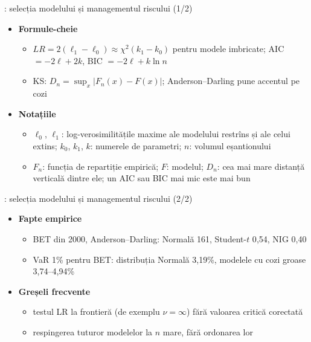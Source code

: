 \begin{frame}{: selecția modelului și managementul riscului (1/2)}
\itemsize{\small}
\begin{itemize}
    \item \textbf{Formule-cheie}
    \begin{itemize}
        \item $LR = 2(\ell_1 - \ell_0) \approx \chi^2(k_1 - k_0)$ pentru modele imbricate; AIC $= -2\ell + 2k$, BIC $= -2\ell + k\ln n$
        \item KS: $D_n = \sup_x|F_n(x) - F(x)|$; Anderson--Darling pune accentul pe cozi
    \end{itemize}
    \item \textbf{Notațiile}
    \begin{itemize}
        \item $\ell_0$, $\ell_1$: log-verosimilitățile maxime ale modelului restrîns și ale celui extins; $k_0$, $k_1$, $k$: numerele de parametri; $n$: volumul eșantionului
        \item $F_n$: funcția de repartiție empirică; $F$: modelul; $D_n$: cea mai mare distanță verticală dintre ele; un AIC sau BIC mai mic este mai bun
    \end{itemize}
\end{itemize}
\end{frame}

\begin{frame}{: selecția modelului și managementul riscului (2/2)}
\itemsize{\small}
\begin{itemize}
    \item \textbf{Fapte empirice}
    \begin{itemize}
        \item BET din 2000, Anderson--Darling: Normală 161, Student-$t$ 0{,}54, NIG 0{,}40
        \item VaR 1\% pentru BET: distribuția Normală 3{,}19\%, modelele cu cozi groase 3{,}74--4{,}94\%
    \end{itemize}
    \item \textbf{Greșeli frecvente}
    \begin{itemize}
        \item testul LR la frontieră (de exemplu $\nu = \infty$) fără valoarea critică corectată
        \item respingerea tuturor modelelor la $n$ mare, fără ordonarea lor
    \end{itemize}
\end{itemize}
\end{frame}

